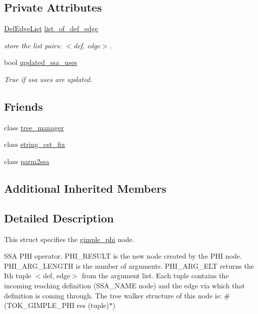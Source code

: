 \subsection*{Private Attributes}
\begin{DoxyCompactItemize}
\item 
\hyperlink{structgimple__phi_abaf4e51c9be92bf7efbf5aaaab82f386}{Def\+Edge\+List} \hyperlink{structgimple__phi_a33d413a383d6b97621c970489d7af257}{list\+\_\+of\+\_\+def\+\_\+edge}
\begin{DoxyCompactList}\small\item\em store the list pairs\+: $<$def, edge$>$. \end{DoxyCompactList}\item 
bool \hyperlink{structgimple__phi_ae1f74d913443a51ae48cf93062419b6a}{updated\+\_\+ssa\+\_\+uses}
\begin{DoxyCompactList}\small\item\em True if ssa uses are updated. \end{DoxyCompactList}\end{DoxyCompactItemize}
\subsection*{Friends}
\begin{DoxyCompactItemize}
\item 
class \hyperlink{structgimple__phi_a254e84412a115167e85294af86ad8de7}{tree\+\_\+manager}
\item 
class \hyperlink{structgimple__phi_a8f716225a40d3aa8c674489228ee74c5}{string\+\_\+cst\+\_\+fix}
\item 
class \hyperlink{structgimple__phi_a7460e57486405df5002c2882f504f969}{parm2ssa}
\end{DoxyCompactItemize}
\subsection*{Additional Inherited Members}


\subsection{Detailed Description}
This struct specifies the \hyperlink{structgimple__phi}{gimple\+\_\+phi} node. 

S\+SA P\+HI operator. P\+H\+I\+\_\+\+R\+E\+S\+U\+LT is the new node created by the P\+HI node. P\+H\+I\+\_\+\+A\+R\+G\+\_\+\+L\+E\+N\+G\+TH is the number of arguments. P\+H\+I\+\_\+\+A\+R\+G\+\_\+\+E\+LT returns the Ith tuple $<$def, edge$>$ from the argument list. Each tuple contains the incoming reaching definition (S\+S\+A\+\_\+\+N\+A\+ME node) and the edge via which that definition is coming through. The tree walker structure of this node is\+: \#(T\+O\+K\+\_\+\+G\+I\+M\+P\+L\+E\+\_\+\+P\+HI res (tuple)$\ast$) 

